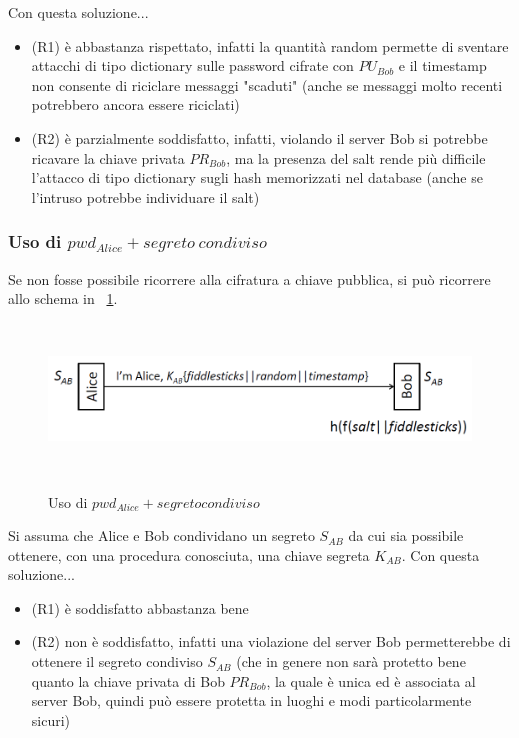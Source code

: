Con questa soluzione...
\begin{itemize}
	\item (R1) è abbastanza rispettato, infatti la quantità random permette di sventare attacchi di tipo dictionary sulle password cifrate con $PU_{Bob}$ e il timestamp non consente di riciclare messaggi "scaduti" (anche se messaggi molto recenti potrebbero ancora essere riciclati)
	\item (R2) è parzialmente soddisfatto, infatti, violando il server Bob si potrebbe ricavare la chiave privata $PR_{Bob}$, ma la presenza del salt rende più difficile l'attacco di tipo dictionary sugli hash memorizzati nel database (anche se l'intruso potrebbe individuare il salt)
\end{itemize}
\subsubsection{Uso di $pwd_{Alice} + segreto \: condiviso$}
Se non fosse possibile ricorrere alla cifratura a chiave pubblica, si può ricorrere allo schema in \figurename~\ref{fig:ImgS42}.
\begin{figure}[htbp]
	\centering%
	\subfigure%
	{\includegraphics[height=4cm, width=12cm, keepaspectratio]{Immagini/autenticazione/ImgS42.png}}
	\caption{Uso di $pwd_{Alice} + segreto condiviso$\label{fig:ImgS42}} 	
\end{figure}
Si assuma che Alice e Bob condividano un segreto $S_{AB}$ da cui sia possibile ottenere, con una procedura conosciuta, una chiave segreta $K_{AB}$.
Con questa soluzione...
\begin{itemize}
	\item (R1) è soddisfatto abbastanza bene
	\item (R2) non è soddisfatto, infatti una violazione del server Bob permetterebbe di ottenere il segreto condiviso $S_{AB}$ (che in genere non sarà protetto bene quanto la chiave privata di Bob $PR_{Bob}$, la quale è unica ed è associata al server Bob, quindi può essere protetta in luoghi e modi particolarmente sicuri)
\end{itemize}
